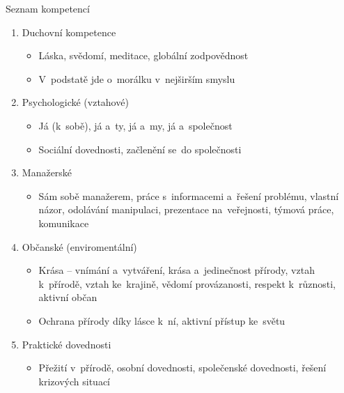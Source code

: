 \documentclass[compress, ucs, xelatex, 11pt, xcolor=dvipsnames, print,
	hyperref={
		bookmarks=true,
		unicode=true,
		colorlinks=true,
		pdftitle={Skautska vychovna metoda},
		plainpages=false,
		pdfauthor={Vojtech Zeisek},
		pdfsubject={Skautska vychovna metoda a jeji vyvoj za posledni stoleti a desetileti},
		pdfcreator={XeLaTeX},
		pdfkeywords={Junak, Pedagogika, Skaut, Skauting, Vychovna metoda},
		linkcolor=Black,
		anchorcolor=Black,
		citecolor=OliveGreen,
		filecolor=OliveGreen,
		menucolor=Black,
		urlcolor=OliveGreen,
		pdftex},
	url={hyphens, lowtilde} %
	]{beamer}
\begin{document}
\begin{frame}{Seznam kompetencí}
	\begin{enumerate}
		\item Duchovní kompetence
		\begin{itemize}
			\item Láska, svědomí, meditace, globální zodpovědnost
			\item V~podstatě jde o~morálku v~nejširším smyslu
		\end{itemize}
			\item Psychologické (vztahové)
		\begin{itemize}
			\item Já (k~sobě), já a~ty, já a~my, já a~společnost
			\item Sociální dovednosti, začlenění se~do společnosti
		\end{itemize}
		\item Manažerské
		\begin{itemize}
			\item Sám sobě manažerem, práce s~informacemi a~řešení problému, vlastní názor, odolávání manipulaci, prezentace na~veřejnosti, týmová práce, komunikace
		\end{itemize}
		\item Občanské (enviromentální)
		\begin{itemize}
			\item Krása -- vnímání a~vytváření, krása a~jedinečnost přírody, vztah k~přírodě, vztah ke~krajině, vědomí provázanosti, respekt k~různosti, aktivní občan
			\item Ochrana přírody díky lásce k~ní, aktivní přístup ke~světu
		\end{itemize}
		\item Praktické dovednosti
		\begin{itemize}
			\item Přežití v~přírodě, osobní dovednosti, společenské dovednosti, řešení krizových situací
		\end{itemize}
	\end{enumerate}
\end{frame}
\end{document}
